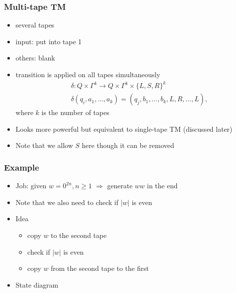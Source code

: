 \begin{frame}[allowframebreaks] \frametitle{Multi-tape TM}
  \begin{itemize}
\item several tapes
\item input: put into tape 1

\item
  [] others: blank
\item transition is applied on all tapes simultaneously
  \begin{eqnarray*}
&& \delta: Q \times \Gamma^k \rightarrow 
Q \times \Gamma^k \times \{L, S, R\}^k     \\
&& \delta(q_i, a_1, \ldots, a_k)
= (q_j, b_1, \ldots, b_k, L, R, \ldots, L),
  \end{eqnarray*}
where $k$ is the number of tapes
\item Looks more powerful but equivalent to single-tape TM (discussed later)
\item Note that we allow $S$ here though it can be removed


\end{itemize}\end{frame} \begin{frame}[allowframebreaks] \frametitle{Example}

  \begin{itemize}
\item Job: given $w = 0^{2n}, n \geq 1$
$\Rightarrow$ generate $ww$ in the end

\item
  [] Note that we also need to check if $|w|$ is even

\item Idea
  \begin{itemize}
  \item copy $w$ to the second tape
  \item check if $|w|$ is even
  \item copy $w$ from the second tape to the first
  \end{itemize}

  
\item State diagram

  \end{itemize}


\end{frame}
